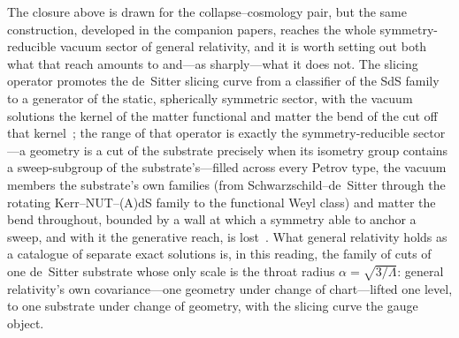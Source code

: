 \documentclass[11pt,a4paper]{article}
\theoremstyle{plain}
\theoremstyle{definition}
\theoremstyle{remark}
\begin{document}
The closure above is drawn for the collapse--cosmology pair, but the same construction, developed in the companion papers, reaches the whole symmetry-reducible vacuum sector of general relativity, and it is worth setting out both what that reach amounts to and---as sharply---what it does not. The slicing operator promotes the de~Sitter slicing curve from a classifier of the SdS family to a generator of the static, spherically symmetric sector, with the vacuum solutions the kernel of the matter functional and matter the bend of the cut off that kernel~\cite{JanzenOperator}; the range of that operator is exactly the symmetry-reducible sector---a geometry is a cut of the substrate precisely when its isometry group contains a sweep-subgroup of the substrate's---filled across every Petrov type, the vacuum members the substrate's own families (from Schwarzschild--de~Sitter through the rotating Kerr--NUT--(A)dS family to the functional Weyl class) and matter the bend throughout, bounded by a wall at which a symmetry able to anchor a sweep, and with it the generative reach, is lost~\cite{JanzenRange}. What general relativity holds as a catalogue of separate exact solutions is, in this reading, the family of cuts of one de~Sitter substrate whose only scale is the throat radius $\alpha=\sqrt{3/\Lambda}$: general relativity's own covariance---one geometry under change of chart---lifted one level, to one substrate under change of geometry, with the slicing curve the gauge object.
\end{document}

